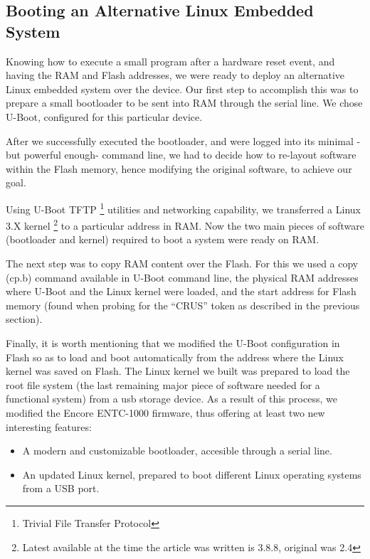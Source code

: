 \documentclass[conference]{IEEEtran}
\begin{document}
\subsection{Booting an Alternative Linux Embedded System}

Knowing how to execute a small program after a
hardware reset event, and having the RAM and Flash
addresses, we were ready to deploy an alternative Linux
embedded system over the device. Our first step to accomplish
this was to prepare a small bootloader to be sent into RAM through the serial line. We chose U-Boot, configured for this
particular device.

After we successfully executed the bootloader, and were
logged into its minimal -but powerful enough- command line,
we had to decide how to re-layout software within the Flash
memory, hence modifying the original software, to achieve our
goal.

Using U-Boot TFTP \footnote{Trivial File Transfer Protocol} utilities and networking capability, we
transferred a Linux 3.X kernel \footnote{Latest available at the time the article was written is 3.8.8, original was 2.4} to a particular address in RAM.
Now the two main pieces of software (bootloader and kernel) required to boot a system
were ready on RAM.

The next step was to copy RAM content over the Flash.
For this we used a copy (cp.b) command available in U-Boot command line, the physical RAM addresses where U-Boot and the Linux kernel were loaded, and the start address for Flash memory (found when probing for the “CRUS” token as described in the previous section).

Finally, it is worth mentioning that we modified the U-Boot configuration in Flash so as to load and boot automatically from the 
address where the Linux kernel was saved on Flash. The Linux kernel we built was prepared to load the root file 
system (the last remaining major piece of software needed for a functional 
system) from a usb storage device. 
As a result of this process, we modified the Encore
ENTC-1000 firmware, thus offering at least two new interesting features:

\begin{itemize}
\item A modern and customizable bootloader, accesible through a serial line.
\item An updated Linux kernel, prepared to boot different
   Linux operating systems from a USB port.
\end{itemize}
\end{document}
